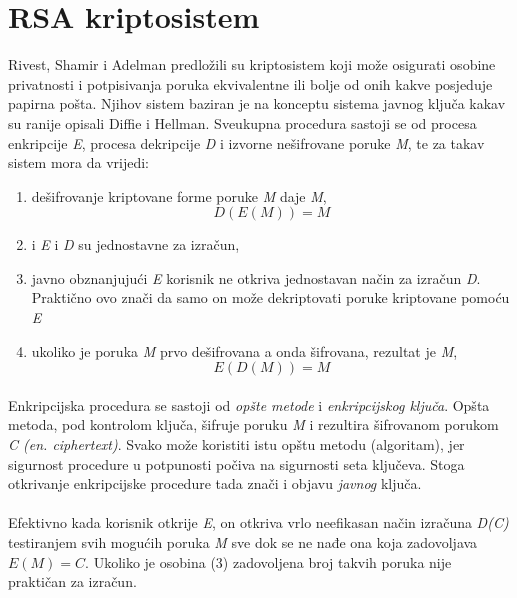 \section{RSA kriptosistem}
Rivest, Shamir i Adelman\cite{rivest1978method} predložili su kriptosistem koji može osigurati osobine privatnosti i potpisivanja poruka ekvivalentne ili bolje od onih kakve posjeduje papirna pošta. Njihov sistem baziran je na konceptu sistema javnog ključa kakav su ranije opisali Diffie i Hellman\cite{diffie1976new}. Sveukupna procedura sastoji se od procesa enkripcije \textit{E}, procesa dekripcije \textit{D} i izvorne nešifrovane poruke \textit{M}, te za takav sistem mora da vrijedi:

\begin{enumerate}
  \item dešifrovanje kriptovane forme poruke \textit{M} daje \textit{M}, \[D(E(M)) = M\]
  \item i \textit{E} i \textit{D} su jednostavne za izračun,
  \item javno obznanjujući \textit{E} korisnik ne otkriva jednostavan način za izračun \textit{D}. Praktično ovo znači da samo on može dekriptovati poruke kriptovane pomoću \textit{E}
  \item ukoliko je poruka \textit{M} prvo dešifrovana a onda šifrovana, rezultat je \textit{M}, \[E(D(M)) = M\]
\end{enumerate}

\paragraph*{}
Enkripcijska procedura se sastoji od \textit{opšte metode} i \textit{enkripcijskog ključa}. Opšta metoda, pod kontrolom ključa, šifruje poruku \textit{M} i rezultira šifrovanom porukom \textit{C (en. ciphertext)}. Svako može koristiti istu opštu metodu (algoritam), jer sigurnost procedure u potpunosti počiva na sigurnosti seta ključeva. Stoga otkrivanje enkripcijske procedure tada znači i objavu \textit{javnog} ključa.

\paragraph*{}
Efektivno kada korisnik otkrije \textit{E}, on otkriva vrlo neefikasan način izračuna \textit{D(C)} testiranjem svih mogućih poruka \textit{M} sve dok se ne nađe ona koja zadovoljava \(E(M) = C\). Ukoliko je osobina (3) zadovoljena broj takvih poruka nije praktičan za izračun.

